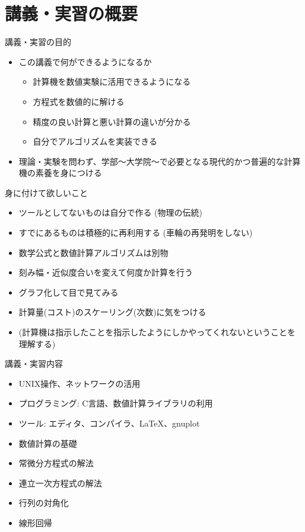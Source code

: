 \section{講義・実習の概要}

\begin{frame}[t]{講義・実習の目的}
  \begin{itemize}
    \item この講義で何ができるようになるか
    \begin{itemize}
      \item 計算機を数値実験に活用できるようになる
    	\item 方程式を数値的に解ける
      \item 精度の良い計算と悪い計算の違いが分かる
	    \item 自分でアルゴリズムを実装できる \\[2em]
    \end{itemize}
    \item 理論・実験を問わず、学部〜大学院〜で必要となる現代的かつ普遍的な計算機の素養を身につける
  \end{itemize}
\end{frame}

\begin{frame}[t]{身に付けて欲しいこと}
  \begin{itemize}
  \item ツールとしてないものは自分で作る (物理の伝統)
  \item すでにあるものは積極的に再利用する (車輪の再発明をしない)
  \item 数学公式と数値計算アルゴリズムは別物
  \item 刻み幅・近似度合いを変えて何度か計算を行う
  \item グラフ化して目で見てみる
  \item 計算量(コスト)のスケーリング(次数)に気をつける
  \item (計算機は指示したことを指示したようにしかやってくれないということを理解する)
  \end{itemize}
\end{frame}

\begin{frame}[t]{講義・実習内容}
  \begin{itemize}
  \item UNIX操作、ネットワークの活用
  \item プログラミング: C言語、数値計算ライブラリの利用
  \item ツール: エディタ、コンパイラ、\LaTeX、gnuplot
  \item 数値計算の基礎
  \item 常微分方程式の解法
  \item 連立一次方程式の解法
  \item 行列の対角化
  \item 線形回帰
  \end{itemize}
\end{frame}

